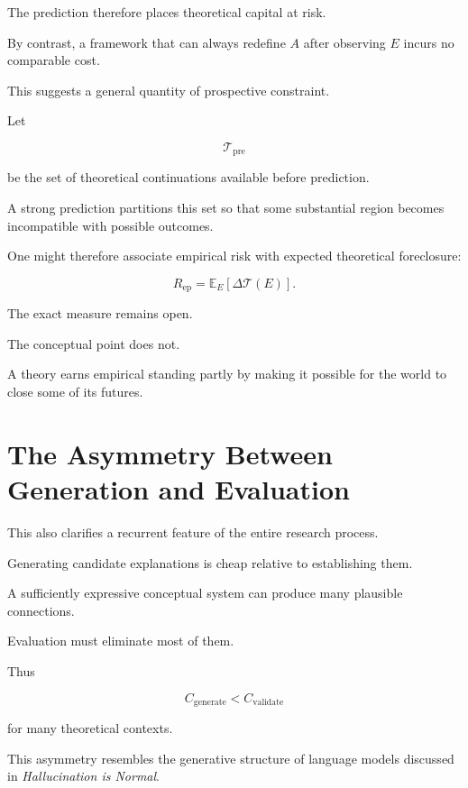 \documentclass[11pt]{article}
\theoremstyle{remark}
\begin{document}
The prediction therefore places theoretical capital at risk.

By contrast, a framework that can always redefine $A$ after observing $E$
incurs no comparable cost.

This suggests a general quantity of prospective constraint.

Let

\begin{equation}
\mathcal{T}_{\mathrm{pre}}
\end{equation}

be the set of theoretical continuations available before prediction.

A strong prediction partitions this set so that some substantial region becomes
incompatible with possible outcomes.

One might therefore associate empirical risk with expected theoretical
foreclosure:

\begin{equation}
R_{\mathrm{ep}}
=
\mathbb{E}_{E}
\left[
\Delta
\mathcal{T}(E)
\right].
\end{equation}

The exact measure remains open.

The conceptual point does not.

A theory earns empirical standing partly by making it possible for the world to
close some of its futures.

\section{The Asymmetry Between Generation and Evaluation}

This also clarifies a recurrent feature of the entire research process.

Generating candidate explanations is cheap relative to establishing them.

A sufficiently expressive conceptual system can produce many plausible
connections.

Evaluation must eliminate most of them.

Thus

\begin{equation}
C_{\mathrm{generate}}
<
C_{\mathrm{validate}}
\end{equation}

for many theoretical contexts.

This asymmetry resembles the generative structure of language models discussed
in \emph{Hallucination is Normal}.
\end{document}
